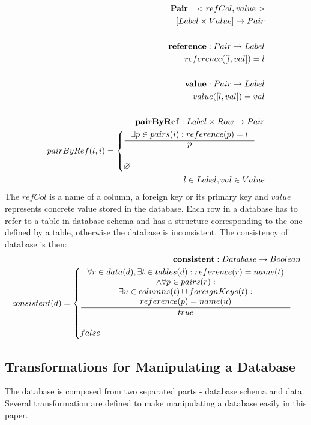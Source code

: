 \documentclass[11pt]{article}
\begin{document}
\begin{align*}
	\mathbf{Pair} = < refCol, value > \\
	[Label \times Value] \rightarrow Pair\\ \\
	\mathbf{reference} : Pair \rightarrow Label \\
	reference([l,val]) = l \\ \\
	\mathbf{value} : Pair \rightarrow Label \\ 
	value([l,val]) = val \\ \\
	\mathbf{pairByRef} : Label \times Row \rightarrow Pair \\
	pairByRef(l,i) = \begin{cases}
			\inference{\exists p \in pairs(i) : reference(p) = l}{p} \\ \\
			\varnothing
		\end{cases}\\
	l \in Label, val \in Value
\end{align*}
The $refCol$ is a name of a column, a foreign key or its primary key and $value$ represents concrete value stored in the database. Each row in a database has to refer to a table in database schema and has a structure corresponding to the one defined by a table, otherwise the database is inconsistent. The consistency of database is then:
\begin{align*}
	\mathbf{consistent} : Database \rightarrow Boolean \\
	consistent(d) = \begin{cases}
 		\inference{\forall r \in data(d), \exists t \in tables(d) : reference(r) = name(t) \\ \wedge \forall p \in pairs(r) :\\ \exists u \in columns(t) \cup foreignKeys(t) : \\ reference(p) = name(u)}{true}
 	\\ \\
 	false
 \end{cases}
\end{align*}
 
\subsection{Transformations for Manipulating a Database}
The database is composed from two separated parts - database schema and data. Several transformation are defined to make manipulating a database easily in this paper.
\end{document}
